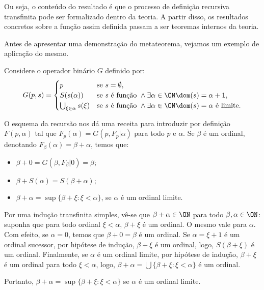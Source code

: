 Ou seja, o conteúdo do resultado é que o processo de definição recursiva transfinita pode ser formalizado dentro da teoria. A partir disso, os resultados concretos sobre a função assim definida passam a ser teoremas internos da teoria.

Antes de apresentar uma demonstração do metateorema, vejamos um exemplo de aplicação do mesmo.
\begin{example}[$\ZFmPI$]\label{exa:somaOrdinal}
    Considere o operador binário $G$ definido por:
    \[
        G(p, s)=\begin{cases}
            p & \text{se } s=\emptyset,\\
            S(s(\alpha)) & \text{se } s\text{ é função } \land  \exists \alpha \in \ON \dom(s)=\alpha+1,\\
            \bigcup_{\xi \in \alpha} s(\xi) & \text{se } s\text{ é função } \land \exists \alpha \in \ON \dom(s)=\alpha \text{ é limite}.
        \end{cases}
    \]

    O esquema da recursão nos dá uma receita para introduzir por definição $F(p, \alpha)$ tal que $F_p(\alpha)=G(p, F_p|\alpha)$ para todo $p$ e $\alpha$.
    Se $\beta$ é um ordinal, denotando $F_\beta(\alpha)=\beta+\alpha$, temos que:

    \begin{itemize}
        \item $\beta+0=G(\beta, F_\beta|0)=\beta$;
        \item $\beta+S(\alpha)=S(\beta+\alpha)$;
        \item $\beta+\alpha=\sup\{\beta+\xi : \xi <\alpha\}$, se $\alpha$ é um ordinal limite.
    \end{itemize}

    Por uma indução transfinita simples, vê-se que $\beta+\alpha \in \ON$ para todo $\beta, \alpha \in \ON$: suponha que para todo ordinal $\xi<\alpha$, $\beta+\xi$ é um ordinal.
    O mesmo vale para $\alpha$. Com efeito, se $\alpha=0$, temos que $\beta+0=\beta$ é um ordinal.
    Se $\alpha=\xi+1$ é um ordinal sucessor, por hipótese de indução, $\beta+\xi$ é um ordinal, logo, $S(\beta+\xi)$ é um ordinal.
    Finalmente, se $\alpha$ é um ordinal limite, por hipótese de indução, $\beta+\xi$ é um ordinal para todo $\xi <\alpha$, logo, $\beta+\alpha=\bigcup\{\beta+\xi : \xi <\alpha\}$ é um ordinal.
    
    Portanto, $\beta+\alpha=\sup\{\beta+\xi : \xi <\alpha\}$ se $\alpha$ é um ordinal limite.
\end{example}

